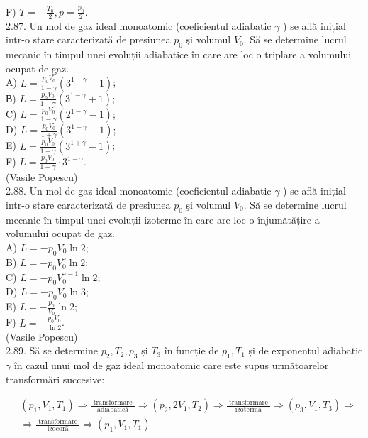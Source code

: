 F) $T=-\frac{T_{0}}{2}, p=\frac{p_{0}}{2}$.\\
2.87. Un mol de gaz ideal monoatomic (coeficientul adiabatic $\gamma$ ) se află inițial intr-o stare caracterizată de presiunea $p_{0}$ şi volumul $V_{0}$. Să se determine lucrul mecanic în timpul unei evoluții adiabatice în care are loc o triplare a volumului ocupat de gaz.\\
A) $L=\frac{p_{0} V_{0}}{1-\gamma}\left(3^{1-\gamma}-1\right)$;\\
В) $L=\frac{p_{0} V_{0}}{1-\gamma}\left(3^{1-\gamma}+1\right)$;\\
C) $L=\frac{p_{0} V_{0}}{1-\gamma}\left(2^{1-\gamma}-1\right)$;\\
D) $L=\frac{p_{0} V_{0}}{1+\gamma}\left(3^{1-\gamma}-1\right)$;\\
E) $L=\frac{p_{0} V_{0}}{1+\gamma}\left(3^{1+\gamma}-1\right)$;\\
F) $L=\frac{p_{0} V_{0}}{1-\gamma} \cdot 3^{1-\gamma}$.\\
(Vasile Popescu)\\
2.88. Un mol de gaz ideal monoatomic (coeficientul adiabatic $\gamma$ ) se află inițial intr-o stare caracterizată de presiunea $p_{0}$ şi volumul $V_{0}$. Să se determine lucrul mecanic în timpul unei evoluții izoterme în care are loc o înjumătățire a volumului ocupat de gaz.\\
A) $L=-p_{0} V_{0} \ln 2$;\\
B) $L=-p_{0} V_{0}^{\gamma} \ln 2$;\\
C) $L=-p_{0} V_{0}^{\gamma-1} \ln 2$;\\
D) $L=-p_{0} V_{0} \ln 3$;\\
E) $L=-\frac{p_{0}}{V_{0}} \ln 2$;\\
F) $L=-\frac{p_{0} V_{0}}{\ln 2}$.\\
(Vasile Popescu)\\
2.89. Să se determine $p_{2}, T_{2}, p_{3}$ și $T_{3}$ în funcție de $p_{1}, T_{1}$ și de exponentul adiabatic $\gamma$ în cazul unui mol de gaz ideal monoatomic care este supus următoarelor transformări succesive:

$$
\begin{aligned}
& \left(p_{1}, V_{1}, T_{1}\right) \Rightarrow \frac{\text { transformare }}{\text { adiabatică }} \Rightarrow\left(p_{2}, 2 V_{1}, T_{2}\right) \Rightarrow \frac{\text { transformare }}{\text { izotermă }} \Rightarrow\left(p_{3}, V_{1}, T_{3}\right) \Rightarrow \\
& \Rightarrow \frac{\text { transformare }}{\text { izocoră }} \Rightarrow\left(p_{1}, V_{1}, T_{1}\right)
\end{aligned}
$$

